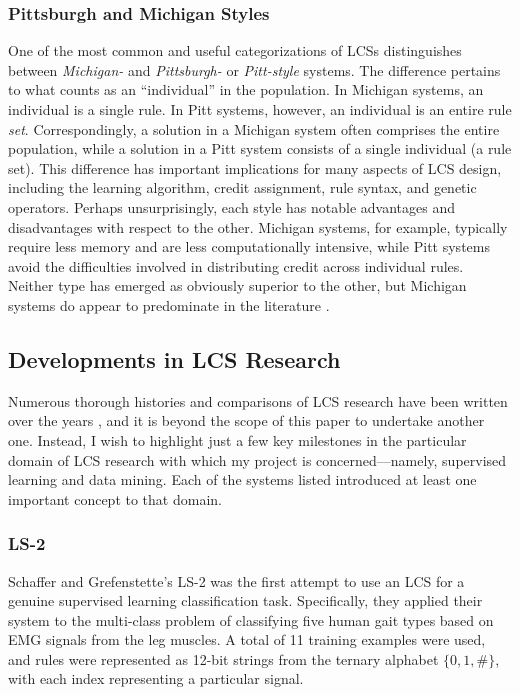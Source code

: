 \documentclass[12pt]{article}
\begin{document}
\subsubsection{Pittsburgh and Michigan Styles}

One of the most common and useful categorizations of LCSs distinguishes between \emph{Michigan-} and \emph{Pittsburgh-} or \emph{Pitt-style} systems. The difference pertains to what counts as an ``individual'' in the population. In Michigan systems, an individual is a single rule. In Pitt systems, however, an individual is an entire rule \emph{set}. Correspondingly, a solution in a Michigan system often comprises the entire population, while a solution in a Pitt system consists of a single individual (a rule set). This difference has important implications for many aspects of LCS design, including the learning algorithm, credit assignment, rule syntax, and genetic operators. Perhaps unsurprisingly, each style has notable advantages and disadvantages with respect to the other. Michigan systems, for example, typically require less memory and are less computationally intensive, while Pitt systems avoid the difficulties involved in distributing credit across individual rules. Neither type has emerged as obviously superior to the other, but Michigan systems do appear to predominate in the literature \cite{urbanowicz_learning_2009}.

\subsection{Developments in LCS Research}

Numerous thorough histories and comparisons of LCS research have been written over the years \cite{urbanowicz_learning_2009, lanzi_roadmap_2000, wilson_critical_1989, wilson_state_2000}, and it is beyond the scope of this paper to undertake another one. Instead, I wish to highlight just a few key milestones in the particular domain of LCS research with which my project is concerned---namely, supervised learning and data mining. Each of the systems listed introduced at least one important concept to that domain.

\subsubsection{LS-2}

Schaffer and Grefenstette's LS-2 \cite{schaffer_multi-objective_1985} was the first attempt to use an LCS for a genuine supervised learning classification task. Specifically, they applied their system to the multi-class problem of classifying five human gait types based on EMG signals from the leg muscles. A total of 11 training examples were used, and rules were represented as 12-bit strings from the ternary alphabet $\{0,1,\#\}$, with each index representing a particular signal.
\end{document}
